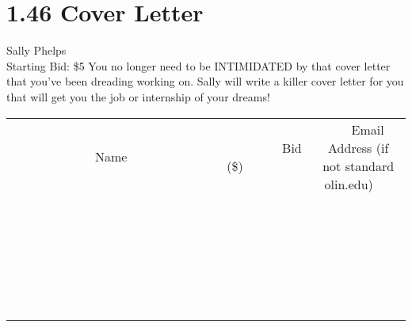 \documentclass[11pt]{article}
\begin{document}
\section*{1.46 Cover Letter}
Sally Phelps
\\
Starting Bid: \$5
\newline
You no longer need to be INTIMIDATED by that cover letter that you've been dreading working on.  Sally will write a killer cover letter for you that will get you the job or internship of your dreams!
\\[6ex]
\begin{tabular}{c c c}
~~~~~~~~~~~~~Name~~~~~~~~~~~~~ & ~~~~~~~~~Bid (\$)~~~~~~~~~  & ~~~Email Address (if not standard olin.edu)~~~\\
 & & \\
\hline
 & & \\
\hline
 & & \\
\hline
 & & \\
\hline
 & & \\
\hline
 & & \\
\hline
 & & \\
\hline
 & & \\
\hline
 & & \\
\hline
 & & \\
\hline
 & & \\
\hline
 & & \\
\hline
 & & \\
\hline
 & & \\
\hline
 & & \\
\hline
 & & \\
\hline
 & & \\
\hline
 & & \\
\hline
 & & \\
\hline
 & & \\
\hline
 & & \\
\hline
 & & \\
\hline
 & & \\
\hline
 & & \\
\hline
 & & \\
\hline
 & & \\
\hline
\end{tabular}
\newpage
\end{document}
